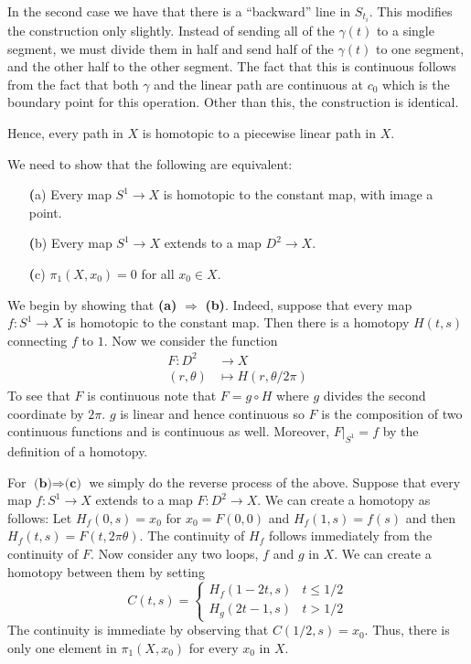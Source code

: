 \documentclass{article}
\newcommand{\exercise}[1]{\noindent{\textbf{Exercise #1:}}}
\begin{document}
In the second case we have that there is a ``backward'' line in
$S_{t_i}$. This modifies the construction only slightly. Instead of
sending all of the $\gamma(t)$ to a single segment, we must divide
them in half and send half of the $\gamma(t)$ to one segment, and the
other half to the other segment. The fact that this is continuous
follows from the fact that both $\gamma$ and the linear path are
continuous at $c_0$ which is the boundary point for this
operation. Other than this, the construction is identical.

Hence, every path in $X$ is homotopic to a piecewise linear path in $X$.

\exercise{1.1.5}

We need to show that the following are equivalent:
\begin{enumerate}
\item[\textbf(a)] Every map $S^1 \to X$ is homotopic to the constant
  map, with image a point.
\item[\textbf(b)] Every map $S^1 \to X$ extends to a map $D^2 \to X$.
\item[\textbf(c)] $\pi_1(X,x_0) = 0$ for all $x_0 \in X$.
\end{enumerate}

We begin by showing that \textbf{(a)} $\Rightarrow$
\textbf{(b)}. Indeed, suppose that every map $f: S^1 \to X$ is
homotopic to the constant map. Then there is a homotopy $H(t,s)$
connecting $f$ to $1$. Now we consider the function
\begin{align*}
  F: D^2 &\to X \\
  (r,\theta) &\mapsto H(r, \theta/2\pi)
\end{align*}
To see that $F$ is continuous note that $F = g \circ H$ where $g$
divides the second coordinate by $2\pi$. $g$ is linear and hence
continuous so $F$ is the composition of two continuous functions and
is continuous as well. Moreover, $F|_{S^1} = f$ by the definition of a
homotopy.

For $\textbf{(b)}\Rightarrow \textbf{(c)}$ we simply do the reverse
process of the above. Suppose that every map $f: S^1 \to X$ extends to
a map $F:D^2 \to X$. We can create a homotopy as follows: Let
$H_f(0,s) = x_0$ for $x_0 = F(0,0)$ and $H_f(1,s) = f(s)$ and then
$H_f(t,s) = F(t, 2\pi\theta)$. The continuity of $H_f$ follows
immediately from the continuity of $F$. Now consider any two loops,
$f$ and $g$ in $X$. We can create a homotopy between them by setting
\[
C(t,s) =
\begin{cases}
  H_f(1-2t,s) & t \leq 1/2 \\
  H_g(2t-1,s) & t > 1/2
\end{cases}
\]
The continuity is immediate by observing that $C(1/2, s) = x_0$. Thus,
there is only one element in $\pi_1(X,x_0)$ for every $x_0$ in $X$.
\end{document}
